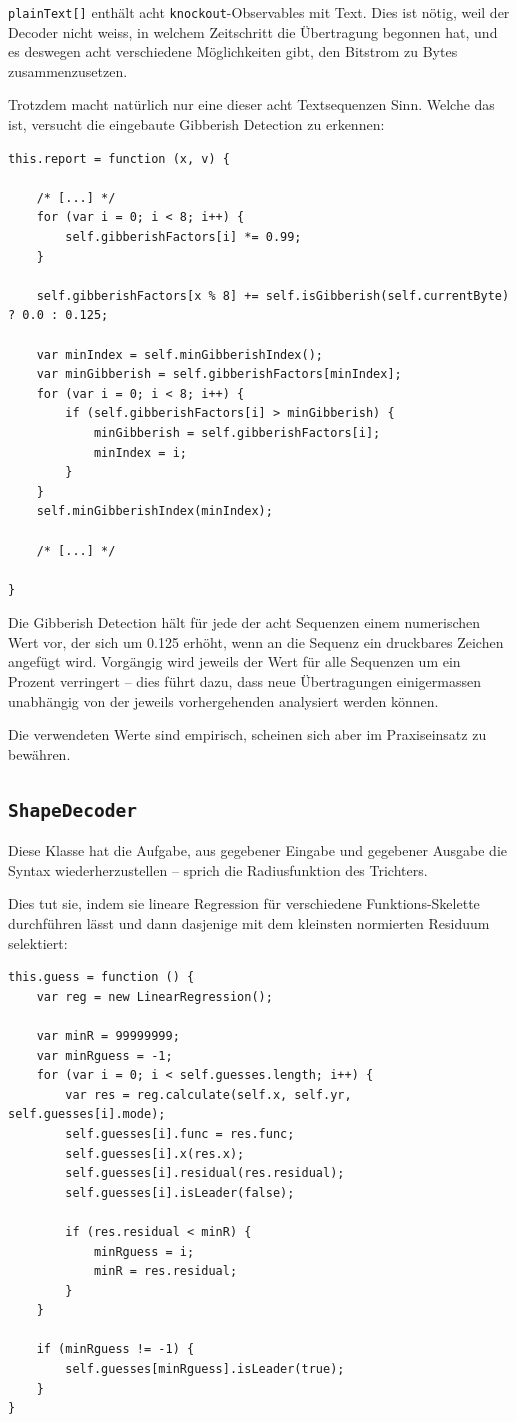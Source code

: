 \documentclass[11pt]{scrreprt} %
\theoremstyle{definition}
\begin{document}
{\tt plainText[]} enthält acht {\tt knockout}-Observables mit Text. Dies ist nötig, weil der Decoder nicht weiss, in welchem Zeitschritt die Übertragung begonnen hat, und es deswegen acht verschiedene Möglichkeiten gibt, den Bitstrom zu Bytes zusammenzusetzen.

Trotzdem macht natürlich nur eine dieser acht Textsequenzen Sinn. Welche das ist, versucht die eingebaute Gibberish Detection zu erkennen:

\begin{lstlisting}
this.report = function (x, v) {
	
	/* [...] */
	for (var i = 0; i < 8; i++) {
		self.gibberishFactors[i] *= 0.99;
	}

	self.gibberishFactors[x % 8] += self.isGibberish(self.currentByte) ? 0.0 : 0.125;
		
	var minIndex = self.minGibberishIndex();
	var minGibberish = self.gibberishFactors[minIndex];
	for (var i = 0; i < 8; i++) {
		if (self.gibberishFactors[i] > minGibberish) {
			minGibberish = self.gibberishFactors[i];
			minIndex = i;
		}
	}
	self.minGibberishIndex(minIndex);

	/* [...] */

}
\end{lstlisting}

Die Gibberish Detection hält für jede der acht Sequenzen einem numerischen Wert vor, der sich um 0.125 erhöht, wenn an die Sequenz ein druckbares Zeichen angefügt wird. Vorgängig wird jeweils der Wert für alle Sequenzen um ein Prozent verringert -- dies führt dazu, dass neue Übertragungen einigermassen unabhängig von der jeweils vorhergehenden analysiert werden können.

Die verwendeten Werte sind empirisch, scheinen sich aber im Praxiseinsatz zu bewähren.

\subsection{{\tt ShapeDecoder}}

Diese Klasse hat die Aufgabe, aus gegebener Eingabe und gegebener Ausgabe die Syntax wiederherzustellen -- sprich die Radiusfunktion des Trichters.

Dies tut sie, indem sie lineare Regression für verschiedene Funktions-Skelette durchführen lässt und dann dasjenige mit dem kleinsten normierten Residuum selektiert:

\begin{lstlisting}
this.guess = function () {
	var reg = new LinearRegression();
		
	var minR = 99999999;
	var minRguess = -1;
	for (var i = 0; i < self.guesses.length; i++) {
		var res = reg.calculate(self.x, self.yr, self.guesses[i].mode);
		self.guesses[i].func = res.func;
		self.guesses[i].x(res.x);
		self.guesses[i].residual(res.residual);
		self.guesses[i].isLeader(false);
			
		if (res.residual < minR) {
			minRguess = i;
			minR = res.residual;
		}
	}
		
	if (minRguess != -1) {
		self.guesses[minRguess].isLeader(true);
	}
}

\end{lstlisting}
\end{document}
